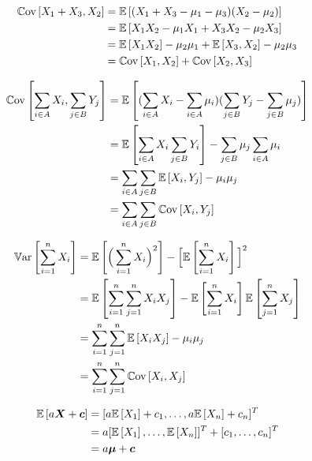 \documentclass[12pt]{article}
\begin{document}
\begin{enumerate}

\begin{align*}
    \mathbb{C}\text{ov}\left[X_1 + X_3, X_2\right] &= \mathbb{E}\left[(X_1+X_3-\mu_1-\mu_3)(X_2-\mu_2)\right] \\
    &= \mathbb{E}\left[X_1X_2-\mu_1X_1+X_3X_2-\mu_2X_3\right] \\
    &= \mathbb{E}\left[X_1X_2\right]-\mu_2\mu_1 + \mathbb{E}\left[X_3,X_2\right]-\mu_2\mu_3 \\
    &= \mathbb{C}\text{ov}\left[X_1, X_2\right] + \mathbb{C}\text{ov}\left[X_2, X_3\right]
\end{align*}


\begin{align*}
    \mathbb{C}\text{ov}\left[\sum_{i \in A} X_i, \sum_{j \in B} Y_j\right] &= \mathbb{E}\left[(\sum_{i \in A} X_i - \sum_{i \in A} \mu_i)(\sum_{j \in B} Y_j - \sum_{j \in B} \mu_j)\right] \\
    &= \mathbb{E}\left[\sum_{i \in A} X_i \sum_{j \in B} Y_i\right] - \sum_{j \in B} \mu_j \sum_{i \in A} \mu_i \\ 
    &= \sum_{i \in A} \sum_{j \in B} \mathbb{E}\left[X_i, Y_j\right] - \mu_i \mu_j \\
    &= \sum_{i \in A} \sum_{j \in B} \mathbb{C}\text{ov}\left[X_i, Y_j\right]
\end{align*}



\begin{align*}
    \mathbb{V}\text{ar}\left[\sum_{i = 1}^n X_i\right] &= \mathbb{E}\left[\Big(\sum_{i=1}^n X_i \Big)^2\right] - \Big[\mathbb{E}\left[\sum_{i=1}^n X_i\right]\Big]^2 \\
    &= \mathbb{E}\left[\sum_{i=1}^n \sum_{j=1}^n X_iX_j\right] - \mathbb{E}\left[\sum_{i=1}^n X_i\right]\mathbb{E}\left[\sum_{j=1}^n X_j\right] \\
    &= \sum_{i=1}^n \sum_{j=1}^n \mathbb{E}\left[X_iX_j\right] - \mu_i\mu_j \\
    &= \sum_{i = 1}^n \sum_{j = 1}^n \mathbb{C}\text{ov}\left[X_i, X_j\right] 
\end{align*}


\begin{align*}
    \mathbb{E}\left[a\boldsymbol{X} + \boldsymbol{c}\right] &= [a\mathbb{E}\left[X_1\right] + c_1, \ldots, a\mathbb{E}\left[X_n\right]+c_n]^T \\ 
    &= a[\mathbb{E}\left[X_1\right], \ldots, \mathbb{E}\left[X_n\right]]^T + [c_1, \ldots, c_n]^T \\
    &= a\boldsymbol{\mu} + \boldsymbol{c}
\end{align*}


\end{enumerate}
\end{document}
